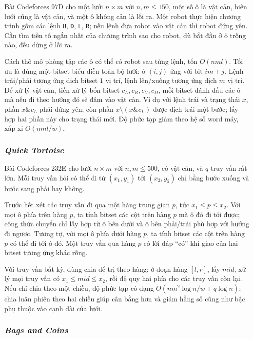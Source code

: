 \documentclass[11pt]{article}
\begin{document}
Bài Codeforces 97D cho một lưới \(n\times m\) với \(n,m\le150\), một số ô là
vật cản, biên lưới cũng là vật cản, và một ô không cản là lối ra. Một robot
thực hiện chương trình gồm các lệnh \texttt{U}, \texttt{D}, \texttt{L},
\texttt{R}; nếu lệnh đưa robot vào vật cản thì robot đứng yên. Cần tìm tiền tố
ngắn nhất của chương trình sao cho robot, dù bắt đầu ở ô trống nào, đều dừng ở
lối ra.

Cách thô mô phỏng tập các ô có thể có robot sau từng lệnh, tốn \(O(nml)\). Tối
ưu là dùng một bitset biểu diễn toàn bộ lưới: ô \((i,j)\) ứng với bit
\(im+j\). Lệnh trái/phải tương ứng dịch bitset \(1\) vị trí, lệnh lên/xuống
tương ứng dịch \(m\) vị trí. Để xử lý vật cản, tiền xử lý bốn bitset
\(c_L,c_R,c_U,c_D\), mỗi bitset đánh dấu các ô mà nếu đi theo hướng đó sẽ đâm
vào vật cản. Ví dụ với lệnh trái và trạng thái \(x\), phần \(x\&c_L\) phải
đứng yên, còn phần \(x\setminus(x\&c_L)\) được dịch trái một bước; lấy hợp hai
phần này cho trạng thái mới. Độ phức tạp giảm theo hệ số word máy, xấp xỉ
\(O(nml/w)\).

\subsubsection{\emph{Quick Tortoise}}

Bài Codeforces 232E cho lưới \(n\times m\) với \(n,m\le500\), có vật cản, và
\(q\) truy vấn rất lớn. Mỗi truy vấn hỏi có thể đi từ \((x_1,y_1)\) tới
\((x_2,y_2)\) chỉ bằng bước xuống và bước sang phải hay không.

Trước hết xét các truy vấn đi qua một hàng trung gian \(p\), tức
\(x_1\le p\le x_2\). Với mọi ô phía trên hàng \(p\), ta tính bitset các cột
trên hàng \(p\) mà ô đó đi tới được; công thức chuyển chỉ lấy hợp từ ô bên dưới
và ô bên phải/trái phù hợp với hướng đi ngược. Tương tự, với mọi ô phía dưới
hàng \(p\), ta tính bitset các cột trên hàng \(p\) có thể đi tới ô đó. Một
truy vấn qua hàng \(p\) có lời đáp ``có'' khi giao của hai bitset tương ứng
khác rỗng.

Với truy vấn bất kỳ, dùng chia để trị theo hàng: ở đoạn hàng \([l,r]\), lấy
\(\mathit{mid}\), xử lý mọi truy vấn có \(x_1\le\mathit{mid}\le x_2\), rồi đệ
quy hai phía cho các truy vấn còn lại. Nếu chỉ chia theo một chiều, độ phức tạp
có dạng \(O(nm^2\log n/w+q\log n)\); chia luân phiên theo hai chiều giúp cân
bằng hơn và giảm hằng số cũng như bậc phụ thuộc vào cạnh dài của lưới.

\subsubsection{\emph{Bags and Coins}}
\end{document}
